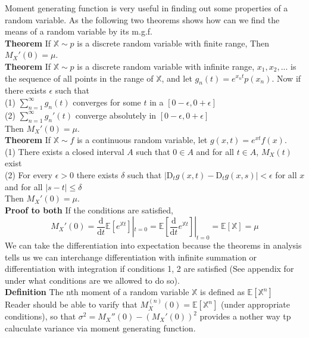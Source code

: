 \documentclass[a4paper,12pt]{article}
\begin{document}
Moment generating function is very useful in finding out some properties of a random variable. As the following two theorems shows how can we find the means of a random variable by its m.g.f.\\

\textbf{Theorem} If $\mathbb{X} \sim p$ is a discrete random variable with finite range, Then $M_X'(0) = \mu$.\\

\textbf{Theorem} If $\mathbb{X} \sim p$ is a discrete random variable with infinite range, $x_1, x_2, ...$ is the sequence of all points in the range of $\mathbb{X}$, and let $g_n(t) = e^{x_n t}p(x_n)$. Now if there exists $\epsilon$ such that\\
(1) $\sum_{n=1}^\infty g_n(t)$ converges for some $t$ in a $[0-\epsilon, 0+\epsilon]$\\
(2) $\sum_{n=1}^\infty g_n'(t)$ converge absolutely in $[0-\epsilon, 0+\epsilon]$\\

Then $M_X'(0) = \mu$.\\

\textbf{Theorem} If $\mathbb{X} \sim f$ is a continuous random variable, let $g(x, t) = e^{x t}f(x)$.\\
(1) There exists a closed interval $A$ such that $0 \in A$ and for all $t \in A$, $M_X(t)$ exist\\
(2) For every $\epsilon > 0$ there exists $\delta$ such that $| \mathrm{D}_t g(x, t) - \mathrm{D}_t g(x, s) | < \epsilon$ for all $x$ and for all $|s-t|\leq\delta$\\

Then $M_X'(0) = \mu$.\\

\textbf{Proof to both} If the conditions are satisfied,
$$M_X'(0) = \frac{\mathrm{d}}{\mathrm{d} t}\mathbb{E}[e^{\mathbb{X}t}] |_{t=0} = \mathbb{E}[ \frac{\mathrm{d}}{\mathrm{d} t} e^{\mathbb{X}t}] |_{t=0} = \mathbb{E}[\mathbb{X}] = \mu$$
We can take the differentiation into expectation because the theorems in analysis tells us we can interchange differentiation with infinite summation or differentiation with integration if conditions 1, 2 are satisfied (See appendix for under what conditions are we allowed to do so).\\

\textbf{Definition} The nth moment of a random variable $\mathbb{X}$ is defined as $\mathbb{E}[\mathbb{X}^n]$\\

Reader should be able to varify that $M_X^{(n)}(0) = \mathbb{E}[\mathbb{X}^n]$ (under appropriate conditions), so that $\sigma^2 = M_X''(0) - (M_X'(0))^2$ provides a nother way tp caluculate variance via moment generating function.\\
\end{document}
